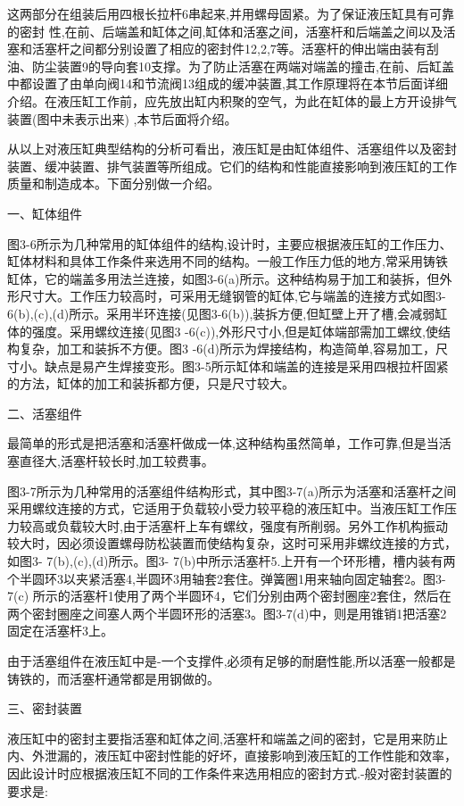 

这两部分在组装后用四根长拉杆6串起来,并用螺母固紧。为了保证液压缸具有可靠的密封
性,在前、后端盖和缸体之间,缸体和活塞之间，活塞杆和后端盖之间以及活塞和活塞杆之间都分别设置了相应的密封件12,2,7等。活塞杆的伸出端由装有刮油、防尘装置9的导向套10支撑。为了防止活塞在两端对端盖的撞击,在前、后缸盖中都设置了由单向阀14和节流阀13组成的缓冲装置,其工作原理将在本节后面详细介绍。在液压缸工作前，应先放出缸内积聚的空气，为此在缸体的最上方开设排气装置(图中未表示出来) ,本节后面将介绍。

\indent 从以上对液压缸典型结构的分析可看出，液压缸是由缸体组件、活塞组件以及密封装置、缓冲装置、排气装置等所组成。它们的结构和性能直接影响到液压缸的工作质量和制造成本。下面分别做一介绍。

\indent 一、缸体组件

\indent 图3-6所示为几种常用的缸体组件的结构,设计时，主要应根据液压缸的工作压力、缸体材料和具体工作条件来选用不同的结构。一般工作压力低的地方,常采用铸铁缸体，它的端盖多用法兰连接，如图3-6(a)所示。这种结构易于加工和装拆，但外形尺寸大。工作压力较高时，可采用无缝钢管的缸体,它与端盖的连接方式如图3-6(b),(c),(d)所示。采用半环连接(见图3-6(b)),装拆方便,但缸壁上开了槽,会减弱缸体的强度。采用螺纹连接(见图3 -6(c)),外形尺寸小,但是缸体端部需加工螺纹,使结构复杂，加工和装拆不方便。图3 -6(d)所示为焊接结构，构造简单,容易加工，尺寸小。缺点是易产生焊接变形。图3-5所示缸体和端盖的连接是采用四根拉杆固紧的方法，缸体的加工和装拆都方便，只是尺寸较大。

\indent 二、活塞组件

\indent 最简单的形式是把活塞和活塞杆做成一体,这种结构虽然简单，工作可靠,但是当活塞直径大,活塞杆较长时,加工较费事。

\indent 图3-7所示为几种常用的活塞组件结构形式，其中图3-7(a)所示为活塞和活塞杆之间采用螺纹连接的方式，它适用于负载较小受力较平稳的液压缸中。当液压缸工作压力较高或负载较大时,由于活塞杆上车有螺纹，强度有所削弱。另外工作机构振动较大时，因必须设置螺母防松装置而使结构复杂，这时可采用非螺纹连接的方式，如图3- 7(b),(c),(d)所示。图3- 7(b)中所示活塞杆5.上开有一个环形槽，槽内装有两个半圆环3以夹紧活塞4,半圆环3用轴套2套住。弹簧圈1用来轴向固定轴套2。图3-7(c) 所示的活塞杆1使用了两个半圆环4，它们分别由两个密封圈座2套住，然后在两个密封圈座之间塞人两个半圆环形的活塞3。图3-7(d)中，则是用锥销1把活塞2固定在活塞杆3上。

\indent 由于活塞组件在液压缸中是-一个支撑件,必须有足够的耐磨性能,所以活塞一般都是铸铁的，而活塞杆通常都是用钢做的。

\indent 三、密封装置

\indent 液压缸中的密封主要指活塞和缸体之间,活塞杆和端盖之间的密封，它是用来防止内、外泄漏的，液压缸中密封性能的好坏，直接影响到液压缸的工作性能和效率，因此设计时应根据液压缸不同的工作条件来选用相应的密封方式.-般对密封装置的要求是:

